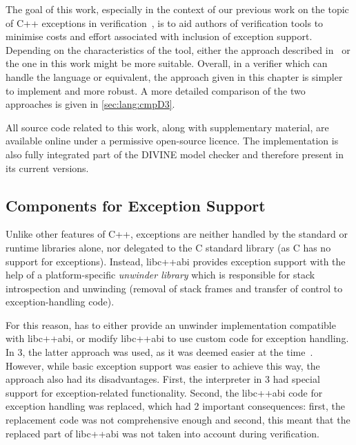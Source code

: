 The goal of this work, especially in the context of our previous work
on the topic of C++ exceptions in
verification~, is to aid authors of
verification tools to minimise costs and effort associated with
inclusion of exception support. Depending on the characteristics of the
tool, either the approach described in~ or
the one in this work might be more suitable. Overall, in a verifier
which can handle the \divm{} language or equivalent, the approach given in
this chapter is simpler to implement and more robust. A more detailed
comparison of the two approaches is given in \autoref{sec:lang:cmpD3}.

All source code related to this work, along with supplementary material, are available online under a permissive open-source licence.
The implementation is also fully integrated part of the DIVINE model checker
and therefore present in its current versions.

\subsection{Components for Exception Support}

Unlike other features of C++, exceptions are neither handled by the
standard or runtime libraries alone, nor delegated to the C standard
library (as C has no support for exceptions). Instead,
libc++abi provides exception support with the help of a
platform-specific \emph{unwinder library} which is responsible for stack
introspection and unwinding (removal of stack frames and transfer of
control to exception-handling code).

For this reason, \divine{} has to either provide an unwinder implementation
compatible with libc++abi, or modify libc++abi to use
custom code for exception handling. In \divine{} 3, the latter approach was
used, as it was deemed easier at the
time~. However, while basic exception
support was easier to achieve this way, the approach also had its
disadvantages. First, the \llvm{} interpreter in \divine{} 3 had special
support for exception-related functionality. Second, the
libc++abi code for exception handling was replaced, which had 2
important consequences: first, the replacement code was not
comprehensive enough
and second, this meant that the replaced part of libc++abi was
not taken into account during verification.


